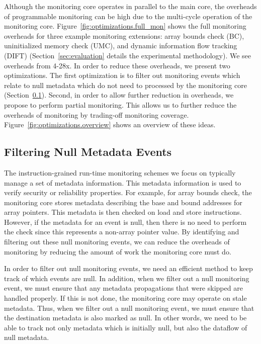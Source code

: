 Although the monitoring core operates in parallel to the main core, the
overheads of programmable monitoring can be high due to the multi-cycle
operation of the monitoring core.
Figure~\ref{fig:optimizations.full_mon} shows the full
monitoring overheads for three example monitoring extensions: array bounds
check (BC), uninitialized memory check (UMC), and dynamic information flow
tracking (DIFT) (Section~\ref{sec:evaluation} details the experimental
methodology). We see overheads from 4-28x. In order to reduce these overheads, we present two
optimizations. The first optimization is to filter out monitoring events which relate to
null metadata which do not need to processed by the monitoring core (Section~\ref{sec:optimizations.filter}). Second, in order to allow
further reduction in overheads, we propose to perform partial monitoring. This
allows us to further reduce the overheads of monitoring by trading-off
monitoring coverage. Figure~\ref{fig:optimizations.overview} shows an overview
of
these ideas.

\subsection{Filtering Null Metadata Events}
\label{sec:optimizations.filter}

The instruction-grained run-time monitoring schemes we focus on typically
manage a set of metadata information. This metadata information is used to
verify security or reliability properties. For example, for array bounds
check, the monitoring core stores metadata describing the base and bound
addresses for array pointers. This metadata is then checked on load and store
instructions. However, if the metadata for an event is null, then there is no
need to perform the check since this represents a non-array pointer value. By
identifying and filtering out these null monitoring events, we can reduce the
overheads of
monitoring by reducing the amount of work the monitoring core must do.

In order to filter out null monitoring events, we need an efficient method to
keep track of which events are null. In addition, when we filter out a null
monitoring event, we must ensure that any metadata propagations that were
skipped are handled properly. If this is not done, the monitoring core may
operate on stale metadata. Thus, when we filter out a null monitoring event,
we must ensure that the destination metadata is also marked as null. 
In other words, we need to be able to track not only
metadata which is initially null, but also the dataflow of null metadata. 

